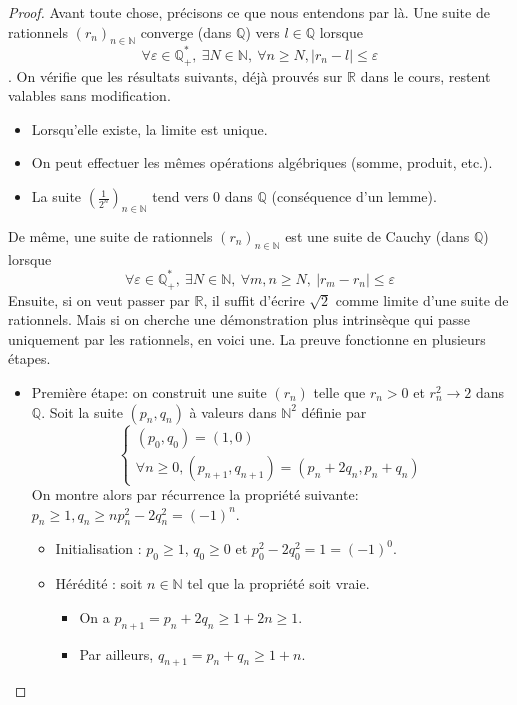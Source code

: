 \documentclass[french]{book}
\newcommand{\Q}{\mathbb{Q}}
\theoremstyle{plain}
\theoremstyle{definition}
\theoremstyle{remark}
\begin{document}
\begin{proof}
Avant toute chose, précisons ce que nous entendons par là. Une suite de
rationnels $(r_{n})_{n\in\mathbb{N}}$ converge (dans $\mathbb{Q}$) vers $l\in\mathbb{Q}$ lorsque $$\forall\varepsilon\in\mathbb{Q}_{+}^{*},\ \exists N\in\mathbb{N},\ \forall n\ge N, |r_{n}-l|\le\varepsilon$$.
On vérifie que les résultats suivants, déjà prouvés sur $\mathbb{R}$ dans le cours, restent valables sans modification.
\begin{itemize}
	\item Lorsqu'elle existe, la limite est unique.
	\item On peut effectuer les mêmes opérations algébriques (somme, produit, etc.).
	\item La suite $\displaystyle(\frac{1}{2^{n}})_{n\in\mathbb{N}}$ tend vers 0 dans $\Q$ (conséquence d'un lemme).
\end{itemize}
De même, une suite de rationnels $(r_{n})_{n\in\mathbb{N}}$ est une suite de Cauchy (dans $\mathbb{Q}$) lorsque $$\forall\varepsilon\in\mathbb{Q}_{+}^{*},\ \exists N\in\mathbb{N},\ \forall m,n\ge N,\ |r_{m}-r_{n}|\le\varepsilon$$
Ensuite, si on veut passer par $\mathbb{R}$, il suffit d'écrire $\sqrt{2}$ comme limite d'une suite de rationnels. Mais si on cherche une démonstration plus intrinsèque qui passe uniquement par les rationnels, en voici une. La preuve fonctionne en plusieurs étapes.
\begin{itemize}
	\item Première étape: on construit une suite $(r_{n})$ telle que $r_{n}>0$ et $r_{n}^{2}\rightarrow2$ dans $\mathbb{Q}$. Soit la suite $(p_{n},q_{n})$ à valeurs dans $\mathbb{N}^{2}$ définie par $$\begin{cases}(p_{0},q_{0})=(1,0)\\ \forall n\ge0,(p_{n+1},q_{n+1})=(p_{n}+2q_{n},p_{n}+q_{n})\end{cases}$$
	On montre alors par récurrence la propriété suivante: $p_{n}\ge1, q_{n}\ge n p_{n}^{2}-2q_{n}^{2}=(-1)^{n}$.
	\begin{itemize}
		\item[--]Initialisation : $p_0 \geqslant 1$, $q_0 \geqslant 0$ et $p_0^2 - 2q_0^2 = 1 = (-1)^0$.
		\item[--]Hérédité : soit $n \in \mathbb{N}$ tel que la propriété soit vraie.
		\begin{itemize}
			\item[*] On a $p_{n+1} = p_n + 2q_n \geqslant 1 + 2n \geqslant 1$.
			\item[*] Par ailleurs, $q_{n+1} = p_n + q_n \geqslant 1 + n$.

\end{itemize}
\end{itemize}
\end{itemize}
\end{proof}
\end{document}
